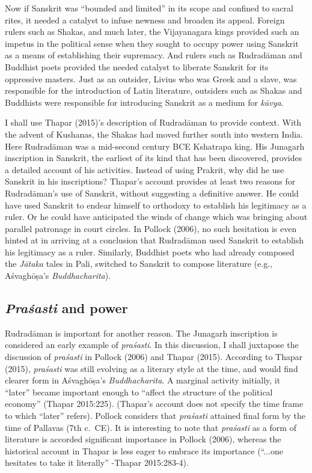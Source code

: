 Now if Sanskrit was “bounded and limited” in its scope and confined to sacral rites, it needed a catalyst to infuse newness and broaden its appeal. Foreign rulers such as Shakas, and much later, the Vijayanagara kings provided such an impetus in the political sense when they sought to occupy power using Sanskrit as a means of establishing their supremacy. And rulers such as Rudradāman and Buddhist poets provided the needed catalyst to liberate Sanskrit for its oppressive masters. Just as an outsider, Livius who was Greek and a slave, was responsible for the introduction of Latin literature, outsiders such as Shakas and Buddhists were responsible for introducing Sanskrit as a medium for {\sl kāvya}.

I shall use Thapar (2015)’s description of Rudradāman to provide context. With the advent of Kushanas, the Shakas had moved further south into western India. Here Rudradāman was a mid-second century BCE Kshatrapa king. His Junagarh inscription in Sanskrit, the earliest of its kind that has been discovered, provides a detailed account of his activities. Instead of using Prakrit, why did he use Sanskrit in his inscriptions? Thapar’s account provides at least two reasons for Rudradāman’s use of Sanskrit, without suggesting a definitive answer. He could have used Sanskrit to endear himself to orthodoxy to establish his legitimacy as a ruler. Or he could have anticipated the winds of change which was bringing about parallel patronage in court circles. In Pollock (2006), no such hesitation is even hinted at in arriving at a conclusion that Rudradāman used Sanskrit to establish his legitimacy as a ruler. Similarly, Buddhist poets who had already composed the {\sl Jātaka} tales in Pali, switched to Sanskrit to compose literature (e.g., Aśvaghōṣa’s {\sl Buddhacharita}). 

\subsection{{\sl Praśasti} and power}

Rudradāman is important for another reason. The Junagarh inscription is considered an early example of {\sl praśasti}. In this discussion, I shall juxtapose the discussion of {\sl praśasti} in Pollock (2006) and Thapar (2015). According to Thapar (2015), {\sl praśasti} was still evolving as a literary style at the time, and would find clearer form in Aśvaghōṣa’s {\sl Buddhacharita}. A marginal activity initially, it “later” became important enough to “affect the structure of the political economy” (Thapar 2015:225). (Thapar’s account does not specify the time frame to which “later” refers). Pollock considers that {\sl praśasti} attained final form by the time of Pallavas (7th c.\ CE). It is interesting to note that {\sl praśasti} as a form of literature is accorded significant importance in Pollock (2006), whereas the historical account in Thapar is less eager to embrace its importance (“...one hesitates to take it literally” -Thapar 2015:283-4).

